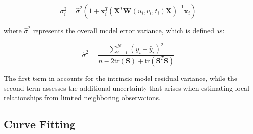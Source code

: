 \begin{equation}
	\sigma_i^2 = \hat{\sigma}^2 \left(1 + \mathbf{x}_i^T (\mathbf{X}^T \mathbf{W}(u_i, v_i, t_i) \mathbf{X})^{-1} \mathbf{x}_i \right)
	\label{eq:gtwr_variance}
\end{equation}

\noindent where $\hat{\sigma}^2$ represents the overall model error variance, which is defined as:

\begin{equation}
	\hat{\sigma}^2 = \frac{\sum_{i=1}^{N} (y_i - \hat{y}_i)^2}{n - 2\text{tr}(\mathbf{S}) + \text{tr}(\mathbf{S}^T \mathbf{S})}
	\label{eq:model_error_variance}
\end{equation}

The first term in  accounts for the intrinsic model residual variance, while the second term assesses the additional uncertainty that arises when estimating local relationships from limited neighboring observations.



\subsection{Curve Fitting}
\label{subsec:curve_fit}